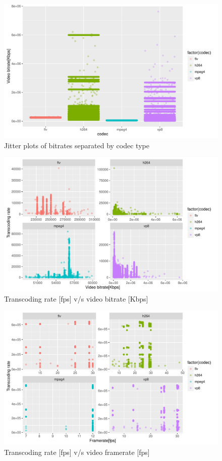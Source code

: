 \documentclass[letterpaper,12pt,titlepage,oneside,final]{report}
\begin{document}
        \begin{figure}[!h]
            \centering
            \includegraphics[width=\textwidth]{bitrate_hist}
            \caption{Jitter plots of bitrates separated by codec type}
            \label{bitrate_hist}
        \end{figure}
        \begin{figure}[!h]
            \centering
            \includegraphics[width=\textwidth]{bitrate_vs_trate}
            \caption{Transcoding rate [fps] v/s video bitrate [Kbps]}
            \label{bitrate_vs_trate}
        \end{figure}
        \begin{figure}[!h]
            \centering
            \includegraphics[width=\textwidth]{framerate_vs_trate}
            \caption{Transcoding rate [fps] v/s video framerate [fps]}
            \label{framerate_vs_trate}
        \end{figure}
\end{document}
